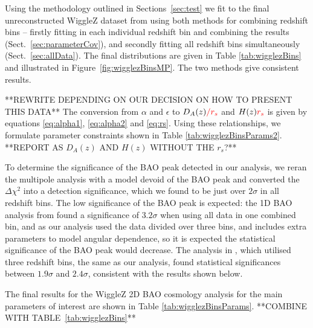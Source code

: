 \documentclass[iop,twocolappendix]{emulateapj}
\newcommand{\green}{\color{green}}
\newcommand{\red}{\color{red}}
\begin{document}
Using the methodology outlined in Sections~\ref{sec:test} we fit to the final unreconstructed WiggleZ dataset from \citet{KazinKoda2014} using both methods for combining redshift bins -- firstly fitting in each individual redshift bin and combining the results (Sect.~\ref{sec:parameterCov}), and secondly fitting all redshift bins simultaneously (Sect.~\ref{sec:allData}). The final distributions are given in Table \ref{tab:wigglezBins} and illustrated in Figure~\ref{fig:wigglezBinsMP}.  The two methods give consistent results. 


{\green  **REWRITE DEPENDING ON OUR DECISION ON HOW TO PRESENT THIS DATA**
The conversion from $\alpha$ and $\epsilon$ to $D_A(z){\red /r_s}$ and $H(z) {\red r_s}$ is given by equations \eqref{eq:alpha1}, \eqref{eq:alpha2} and \eqref{eq:rs}. Using these relationships, we formulate parameter constraints shown in {\red Table \ref{tab:wigglezBinsParams2}. **REPORT AS $D_A(z)$ AND $H(z)$ WITHOUT THE $r_s$?**} }

To determine the significance of the BAO peak detected in our analysis, we reran the multipole analysis with a model devoid of the BAO peak and converted the $\Delta \chi^2$ into a detection significance, which we found to be just over $2\sigma$ in all redshift bins. The low significance of the BAO peak is expected: the 1D BAO analysis from \citet{BlakeDavis2011} found a significance of $3.2\sigma$ when using all data in one combined bin, and as our analysis used the data divided over three bins, and includes extra parameters to model angular dependence, so it is expected the statistical significance of the BAO peak would decrease. The analysis in \citet{BlakeKazin2011}, which utilised three redshift bins, the same as our analysis, found statistical significances between $1.9\sigma$ and $2.4\sigma$, consistent with the results shown below.

The final results for the WiggleZ 2D BAO cosmology analysis for the main parameters of interest are shown in {\red Table \ref{tab:wigglezBinsParams}. **COMBINE WITH TABLE~\ref{tab:wigglezBins}**}
\end{document}
